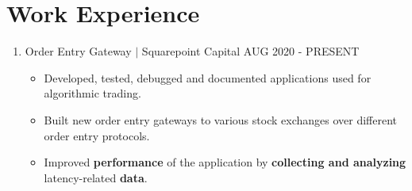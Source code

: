 \documentclass{article}
\begin{document}
\section*{Work Experience}
\begin{enumerate}
\item
    Order Entry Gateway
    $\mid$
    Squarepoint Capital
    \hfill
    AUG 2020 - PRESENT

    \begin{itemize}[noitemsep,nolistsep]
        \item
            Developed, tested, debugged and documented applications used for
            algorithmic trading.
        \item
            Built new order entry gateways to various stock exchanges over different order entry protocols.
        \item
            Improved \textbf{performance} of the application by
            \textbf{collecting and analyzing} latency-related \textbf{data}.
    \end{itemize}

\end{enumerate}
\end{document}
